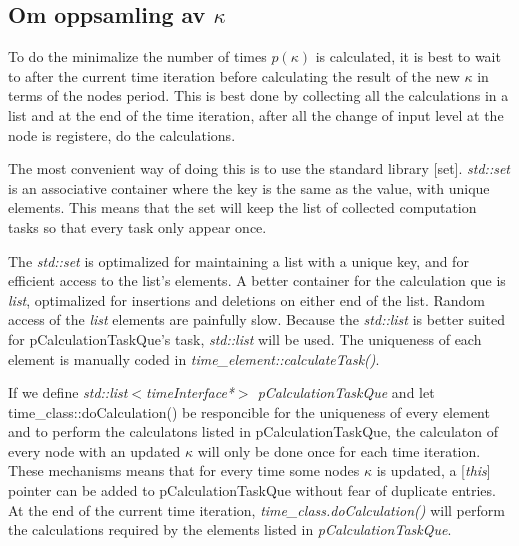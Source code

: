 \subsection{Om oppsamling av $\kappa$}
\label{ssecCalcultaionTaskQue}
To do the minimalize the number of times $p(\kappa)$ is calculated, it is best to wait to after the current time iteration before calculating the result of the new $\kappa$ in terms of the nodes period.
This is best done by collecting all the calculations in a list and at the end of the time iteration, after all the change of input level at the node is registere, do the calculations.

The most convenient way of doing this is to use the standard library [set]. %
\emph{std::set} is an associative container where the key is the same as the value, with unique elements. %
This means that the set will keep the list of collected computation tasks so that every task only appear once.

The \emph{std::set} is optimalized for maintaining a list with a unique key, and for efficient access to the list's elements. 
A better container for the calculation que is \emph{list}, optimalized for insertions and deletions on either end of the list. Random access of the \emph{list} elements are painfully slow\cite{Stroustrup2000KAP17}.
Because the \emph{std::list} is better suited for pCalculationTaskQue's task, \emph{std::list} will be used.
The uniqueness of each element is manually coded in \emph{time\_element::calculateTask()}.

If we define \emph{std::list$<$timeInterface*$>$ pCalculationTaskQue} and let time\_class::doCalculation() be responcible for the uniqueness of every element and to perform the calculatons listed in pCalculationTaskQue, 
	the calculaton of every node with an updated $\kappa$ will only be done once for each time iteration.
These mechanisms means that for every time some nodes $\kappa$ is updated, a [\emph{this}] pointer can be added to pCalculationTaskQue without fear of duplicate entries. 
At the end of the current time iteration, \emph{time\_class.doCalculation()} will perform the calculations required by the elements listed in \emph{pCalculationTaskQue}.    %




